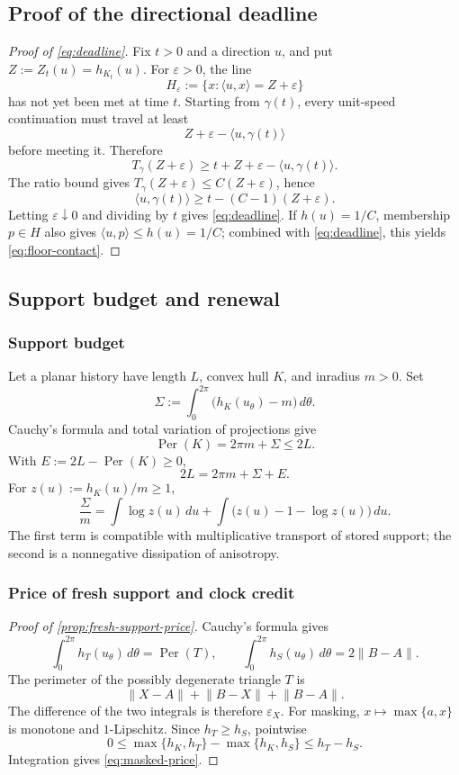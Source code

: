 \documentclass[10pt,a4paper]{article}
\theoremstyle{definition}
\theoremstyle{remark}
\DeclareMathOperator{\Per}{Per}
\newcommand{\norm}[1]{\lVert #1\rVert}
\newcommand{\ip}[2]{\langle #1,#2\rangle}
\newcommand{\eps}{\varepsilon}
\begin{document}
\subsection{Proof of the directional deadline}
\label{app:deadline-proof}
\begin{proof}[Proof of \eqref{eq:deadline}]
Fix $t>0$ and a direction $u$, and put $Z:=Z_t(u)=h_{K_t}(u)$. For $\eps>0$, the line
\[
H_\eps:=\{x:\ip{u}{x}=Z+\eps\}
\]
has not yet been met at time $t$. Starting from $\gamma(t)$, every unit-speed continuation must travel at least
\[
Z+\eps-\ip{u}{\gamma(t)}
\]
before meeting it. Therefore
\[
T_\gamma(Z+\eps)
\ge t+Z+\eps-\ip{u}{\gamma(t)}.
\]
The ratio bound gives $T_\gamma(Z+\eps)\le C(Z+\eps)$, hence
\[
\ip{u}{\gamma(t)}\ge t-(C-1)(Z+\eps).
\]
Letting $\eps\downarrow0$ and dividing by $t$ gives \eqref{eq:deadline}. If $h(u)=1/C$, membership $p\in H$ also gives $\ip{u}{p}\le h(u)=1/C$; combined with \eqref{eq:deadline}, this yields \eqref{eq:floor-contact}.
\end{proof}

\subsection{Support budget and renewal}
\label{app:support-budget}
\subsubsection{Support budget}
Let a planar history have length $L$, convex hull $K$, and inradius $m>0$. Set
\[
\Sigma:=\int_0^{2\pi}\bigl(h_K(u_\theta)-m\bigr)\,d\theta.
\]
Cauchy's formula and total variation of projections give
\[
\Per(K)=2\pi m+\Sigma\le2L.
\]
With $E:=2L-\Per(K)\ge0$,
\begin{equation}
2L=2\pi m+\Sigma+E.
\label{eq:support-budget}
\end{equation}
For $z(u):=h_K(u)/m\ge1$,
\[
\frac{\Sigma}{m}
=\int\log z(u)\,du
 +\int\bigl(z(u)-1-\log z(u)\bigr)\,du.
\]
The first term is compatible with multiplicative transport of stored support; the second is a nonnegative dissipation of anisotropy.

\subsubsection{Price of fresh support and clock credit}
\begin{proof}[Proof of \cref{prop:fresh-support-price}]
Cauchy's formula gives
\[
\int_0^{2\pi}h_T(u_\theta)\,d\theta=\Per(T),
\qquad
\int_0^{2\pi}h_S(u_\theta)\,d\theta=2\norm{B-A}.
\]
The perimeter of the possibly degenerate triangle $T$ is
\[
\norm{X-A}+\norm{B-X}+\norm{B-A}.
\]
The difference of the two integrals is therefore $\eps_X$. For masking, $x\mapsto\max\{a,x\}$ is monotone and $1$-Lipschitz. Since $h_T\ge h_S$, pointwise
\[
0\le\max\{h_K,h_T\}-\max\{h_K,h_S\}\le h_T-h_S.
\]
Integration gives \eqref{eq:masked-price}.
\end{proof}
\end{document}
